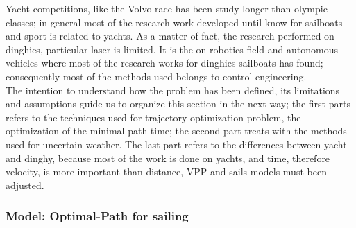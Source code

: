 Yacht competitions, like the Volvo race has been study longer than olympic classes; in general most of the research work developed until know for sailboats and sport is related to yachts. As a matter of fact, the research performed on dinghies, particular laser is limited. It is the on robotics field and autonomous vehicles where most of the research works for dinghies sailboats has found; consequently most of the methods used belongs to control engineering. %
\\
The intention to understand how the problem has been defined, its limitations and assumptions guide us to organize this section in the next way;  the first parts refers to the techniques used for trajectory optimization problem, the optimization of the minimal path-time; the second part treats with the methods used for uncertain weather. The last part refers to the differences between yacht and dinghy, because most of the work is done on yachts, and time, therefore velocity, is more important than distance, VPP and sails models must been adjusted.
\par %

\subsubsection{Model: Optimal-Path for sailing}

